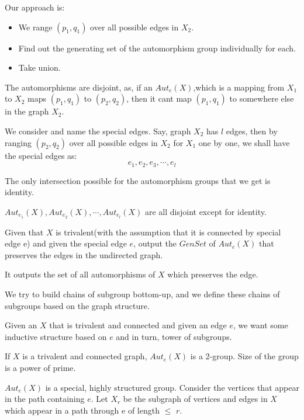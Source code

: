 Our approach is:
\begin{itemize}
\item We range $(p_1,q_1)$ over all possible edges in $X_2$. 
\item Find out the generating set of the automorphism group individually for each. 
\item Take union.
\end{itemize}
The automorphisms are disjoint, as, if an $Aut_e(X)$,which is a mapping from $X_1$ to $X_2$ maps $(p_1,q_1)$ to $(p_2,q_2)$, then it cant map $(p_1,q_1)$ to somewhere else in the graph $X_2$.
  
  We consider and name the special edges. Say, graph $X_2$ has $l$ edges, then by ranging $(p_2,q_2)$ over all possible edges in $X_2$ for $X_1$ one by one, we shall have the special edges as:
   \[ e_1, e_2 , e_3,\cdots,e_l\]
  \begin{observation} The only intersection possible for the automorphism groups that we get is identity.
  \end{observation}
  $ Aut_{e_{1}}(X), Aut_{e_{2}}(X),\cdots,Aut_{e_{l}}(X)$ are all disjoint except for identity.
  
  \begin{problem} Given that $X$ is trivalent(with the assumption that it is connected by special edge e) and  given the special edge $e$, output the $GenSet$ of $Aut_e(X)$ that preserves the edges in the undirected graph.
  \end{problem}
  
  It outputs the set of all automorphisms of  $X$ which preserves the edge.
  
  
  We try to build chains of subgroup bottom-up, and we define these chains of subgroups based on the graph structure.
  
  
  Given an $X$ that is trivalent and connected and given an edge $e$, we want some inductive structure based on $e$ and in turn, tower of subgroups.
  
  
  
  
   
\begin{theorem} If $X$ is a trivalent and connected graph, $Aut_e(X)$ is a 2-group. Size of the group is a power of prime.
\end{theorem}
 
$Aut_e(X)$ is a special, highly structured group. Consider the vertices that appear in the path containing $e$.
Let $X_r$ be the subgraph of vertices and edges in $X$ which appear in a path through e of length $\leqslant$ $r$.


